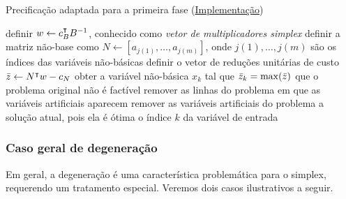\begin{algorithm}
\begin{algorithmic}[1]
    \caption{Precificação adaptada para a primeira fase (\href{https://github.com/phcentenaro7/Caique.jl/blob/9c78027f1884181846a6321a5640f92c9a718ce4/src/Simplex.jl\#L88}{Implementação})}\label{alg:precificação adaptada primeira fase}
    \State definir $ w \gets  c_B^\intercal B^{-1}$, conhecido como \emph{vetor de multiplicadores simplex}
    \State definir a matriz não-base como $ N \gets [a_{j(1)}, \ldots, a_{j(m)}]$, onde $j(1), \ldots, j(m)$ são os índices das variáveis não-básicas
    \State definir o vetor de reduções unitárias de custo $\bar{z} \gets  N^\intercal w - c_N$
    \State obter a variável não-básica $ x_k$ tal que $\bar{z}_{k} = \max(\bar{z})$
                \State \Return que o problema original não é factível
            \Else
                \State remover as linhas do problema em que as variáveis artificiais aparecem
                \State remover as variáveis artificiais do problema
            \EndIf
        \EndIf
        \State \Return a solução atual, pois ela é ótima
    \EndIf
    \State \Return o índice $k$ da variável de entrada
\end{algorithmic}
\end{algorithm}

\subsubsection{Caso geral de degeneração}
Em geral, a degeneração é uma característica problemática para o simplex, requerendo um tratamento especial. Veremos dois casos ilustrativos a seguir.

